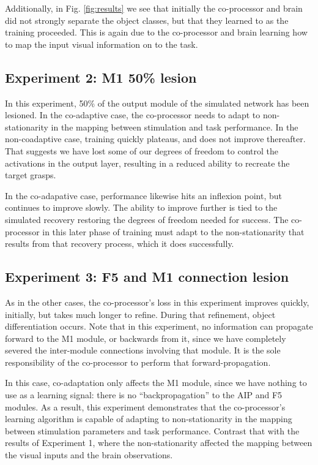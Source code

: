 \documentclass[12pt]{iopart}
\begin{document}
Additionally, in Fig. \ref{fig:results} we see that initially the co-processor and
brain did not strongly separate the object classes, but that they learned to as the
training proceeded. This is again due to the co-processor and brain learning how
to map the input visual information on to the task.

\subsection{Experiment 2: M1 50\% lesion}
In this experiment, 50\% of the output module of the simulated network has been
lesioned. In the co-adaptive case, the co-processor needs to adapt to
non-stationarity in the mapping between stimulation and task performance.
In the non-coadaptive case, training quickly plateaus, and does not improve
thereafter. That suggests we have lost some of our degrees of freedom to control
the activations in the output layer, resulting in a reduced ability to recreate
the target grasps.

In the co-adapative case, performance likewise hits an inflexion point, but
continues to improve slowly. The ability to improve further is tied to the
simulated recovery restoring the degrees of freedom needed for success. The
co-processor in this later phase of training must adapt to the
non-stationarity that results from that recovery process, which it does
successfully.

\subsection{Experiment 3: F5 and M1 connection lesion}
As in the other cases, the co-processor's loss in this experiment improves
quickly, initially, but takes much longer to refine. During that refinement,
object differentiation occurs. Note that in this experiment, no information
can propagate forward to the M1 module, or backwards from it, since we have
completely severed the inter-module connections involving that module. It is
the sole responsibility of the co-processor to perform that
forward-propagation.

In this case, co-adaptation only affects the M1 module, since we have nothing
to use as a learning signal: there is no ``backpropagation'' to the AIP and
F5 modules. As a result, this experiment demonstrates that the
co-processor's learning algorithm is capable of adapting to non-stationarity
in the mapping between stimulation parameters and task performance. Contrast
that with the results of Experiment 1, where the non-stationarity affected
the mapping between the visual inputs and the brain observations.
\end{document}
